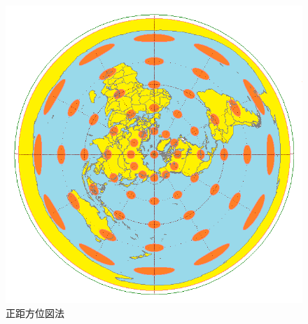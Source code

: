 \begin{figure}[tp]
  \centering
  \includegraphics[scale=0.8]{fig/teiso3.png}
  \caption{正距方位図法\cite{20}}\label{teiso3}
\end{figure}

